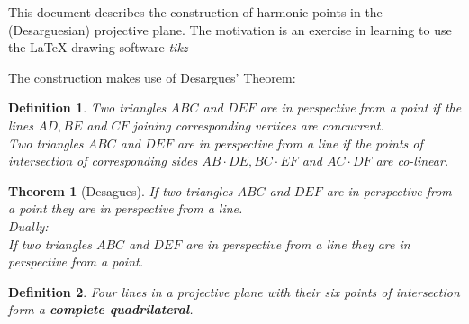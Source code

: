 \documentclass{article}
\newcommand{\software}[1]{\textit{#1}}
\newcommand{\newterm}[1]{\textbf{#1}}
\newtheorem*{theorem}{Theorem}
\newtheorem*{definition}{Definition}
\begin{document}
This document describes the construction of harmonic points in the
(Desarguesian) projective plane. The motivation is an exercise in learning to
use the LaTeX drawing software \software{tikz}


The construction makes use of Desargues' Theorem:
\begin{definition}
  Two triangles $ABC$ and $DEF$ are in perspective from a point if the
  lines   $AD,BE$ and  $CF$ joining corresponding vertices are concurrent.  \\
  Two triangles $ABC$ and $DEF$ are in perspective from a line if the points
  of intersection of corresponding sides $AB \cdot DE, BC \cdot EF $ and
  $AC \cdot DF$ are co-linear. 
\end{definition}
\begin{theorem}[Desagues]
  If two triangles $ABC$ and $DEF$ are in perspective from a point they are in perspective from a line.\\
  Dually:\\
  If two triangles $ABC$ and $DEF$ are in perspective from a line they are in perspective from a point.
\end{theorem}
\begin{definition}
  Four lines in a projective plane with their six points of intersection form a \newterm{complete quadrilateral}.
\end{definition}
\end{document}
